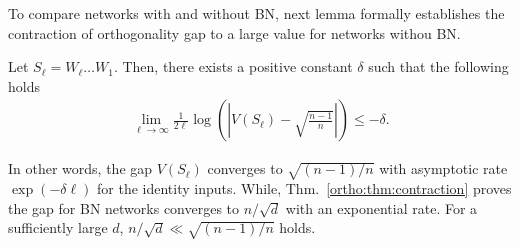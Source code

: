  
 To compare networks with and without BN,
  next lemma formally establishes the contraction of orthogonality gap to a large value for networks withou BN. 
 \begin{lemma} \label{ortho:lemma:linear}
 Let $S_{\ell} = W_{\ell} \dots W_{1}$. Then, there exists a positive constant $\delta$ such that the following holds
 \begin{align}
       \lim_{\ell \to \infty} \frac{1}{2 \ell}\log\left( \left|V(S_\ell)-\sqrt{\frac{n-1}{n}}\right|\right) \leq -\delta. 
  \end{align}
 \end{lemma} 
 In other words, the gap $V(S_\ell)$ converges to $\sqrt{(n-1)/n}$ with asymptotic rate $\exp(-\delta \ell)$ for the identity inputs. While, Thm.~\ref{ortho:thm:contraction} proves the gap for BN networks converges to $n/\sqrt{d}$ with an exponential rate. For a sufficiently large $d$, $n/\sqrt{d} \ll \sqrt{(n-1)/n}$ holds.
